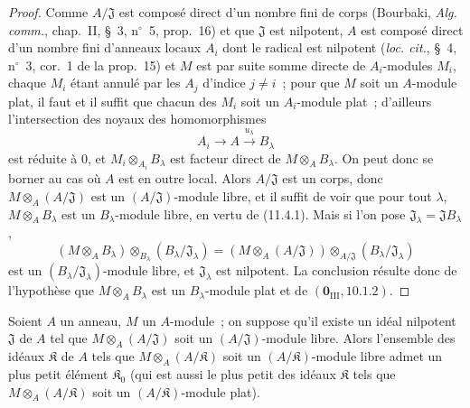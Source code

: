 \begin{proof}
Comme $A/\mathfrak J$ est composé direct d'un nombre fini de corps (Bourbaki,
\emph{Alg. comm.}, chap.~II, \S~3, n$^\circ$~5, prop.~16) et que $\mathfrak J$
est nilpotent, $A$ est composé direct d'un nombre fini d'anneaux locaux $A_i$
dont le radical est nilpotent (\emph{loc. cit.}, \S~4, n$^\circ$~3, cor.~1 de
la prop.~15) et $M$ est par suite somme directe de $A_i$-modules $M_i$, chaque
$M_i$ étant annulé par les $A_j$ d'indice $j\neq i$~; pour que $M$ soit un
$A$-module plat, il faut et il suffit que chacun des $M_i$ soit un $A_i$-module
plat~; d'ailleurs l'intersection des noyaux des homomorphismes
\[
A_i\longrightarrow A\xrightarrow{u_\lambda}B_\lambda
\]
est réduite à $0$, et $M_i\otimes_{A_i}B_\lambda$ est facteur direct de
$M\otimes_A B_\lambda$. On peut donc se borner au cas où $A$ est en outre
local. Alors $A/\mathfrak J$ est un corps, donc
$M\otimes_A(A/\mathfrak J)$ est un $(A/\mathfrak J)$-module libre, et il
suffit de voir que pour tout $\lambda$, $M\otimes_A B_\lambda$ est un
$B_\lambda$-module libre, en vertu de (11.4.1). Mais si l'on pose
$\mathfrak J_\lambda=\mathfrak JB_\lambda$,
\[
(M\otimes_A B_\lambda)\otimes_{B_\lambda}(B_\lambda/\mathfrak J_\lambda)
=(M\otimes_A(A/\mathfrak J))\otimes_{A/\mathfrak J}
 (B_\lambda/\mathfrak J_\lambda)
\]
est un $(B_\lambda/\mathfrak J_\lambda)$-module libre, et
$\mathfrak J_\lambda$ est nilpotent. La conclusion résulte donc de l'hypothèse
que $M\otimes_A B_\lambda$ est un $B_\lambda$-module plat et de
$(\mathbf 0_{\mathrm{III}},10.1.2)$.
\end{proof}

\begin{corollary}[11.4.4]
\label{IV.11.4.4-fr}
Soient $A$ un anneau, $M$ un $A$-module~; on suppose qu'il existe un idéal
nilpotent $\mathfrak J$ de $A$ tel que $M\otimes_A(A/\mathfrak J)$ soit un
$(A/\mathfrak J)$-module libre. Alors l'ensemble des idéaux $\mathfrak K$ de
$A$ tels que $M\otimes_A(A/\mathfrak K)$ soit un $(A/\mathfrak K)$-module
libre admet un plus petit élément $\mathfrak K_0$ (qui est aussi le plus petit
des idéaux $\mathfrak K$ tels que $M\otimes_A(A/\mathfrak K)$ soit un
$(A/\mathfrak K)$-module plat).
\end{corollary}


